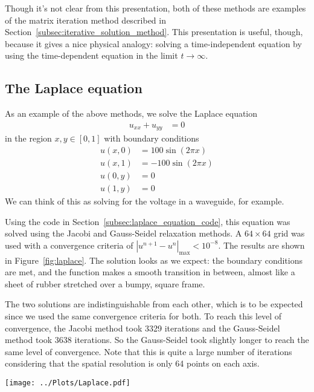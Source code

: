 \documentclass[twocolumn]{myarticle}
\begin{document}
Though it's not clear from this presentation, both of these methods are examples of the matrix iteration method described in Section~\ref{subsec:iterative_solution_method}.
This presentation is useful, though, because it gives a nice physical analogy: solving a time-independent equation by using the time-dependent equation in the limit $ t \to \infty $.

\subsection{The Laplace equation}
\label{subsec:the_laplace_equation}

As an example of the above methods, we solve the Laplace equation
\begin{align}
    u_{xx} + u_{yy} &= 0
\end{align}
in the region $ x, y \in [0, 1] $ with boundary conditions
\begin{align}
    u(x,0) &= 100 \sin \left( 2 \pi x \right)
    \\
    u(x,1) &= -100 \sin \left( 2 \pi x \right)
    \\
    u(0, y) &= 0
    \\
    u(1, y) &= 0
\end{align}
We can think of this as solving for the voltage in a waveguide, for example.

Using the code in Section~\ref{subsec:laplace_equation_code}, this equation was solved using the Jacobi and Gauss-Seidel relaxation methods.
A $ 64 \times 64 $ grid was used with a convergence criteria of $ \left| u^{n+1} - u^{n} \right|_\text{max} < 10^{-8} $.
The results are shown in Figure~\ref{fig:laplace}.
The solution looks as we expect: the boundary conditions are met, and the function makes a smooth transition in between, almost like a sheet of rubber stretched over a bumpy, square frame.

The two solutions are indistinguishable from each other, which is to be expected since we used the same convergence criteria for both.
To reach this level of convergence, the Jacobi method took 3329 iterations and the Gauss-Seidel method took 3638 iterations.
So the Gauss-Seidel took slightly longer to reach the same level of convergence.
Note that this is quite a large number of iterations considering that the spatial resolution is only 64 points on each axis.

\begin{figure*}[ht]
    \centering
    \texttt{[image: ../Plots/Laplace.pdf]}
    \caption{Solutions to the Laplace equation as determined by the Jacobi and Gauss-Seidel relaxation methods.}
    \label{fig:laplace}
\end{figure*}
\end{document}
